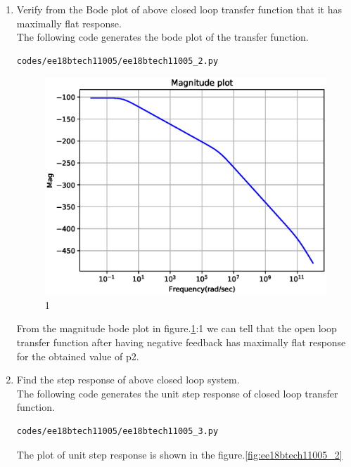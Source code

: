 \begin{enumerate}[label=\thesubsection.\arabic*.,ref=\thesubsection.\theenumi]
\item Verify from the Bode plot of above closed loop transfer function that it has maximally flat response.\\
\solution The following code generates the bode plot of the transfer function.
\begin{lstlisting}
codes/ee18btech11005/ee18btech11005_2.py
\end{lstlisting}
\begin{figure}[!ht]
\centering
\includegraphics[width=\columnwidth]{./figs/ee18btech11005/ee18btech11005_1.eps}
\caption{1}
\label{fig:ee18btech11005_1}
\end{figure}
From the magnitude bode plot in figure.\ref{fig:ee18btech11005_1}:1 we can tell that the open loop transfer function after having negative feedback has maximally flat response for the obtained value of p2. 
\item Find the step response of above closed loop system.\\
\solution The following code generates the unit step response of closed loop transfer function.
\begin{lstlisting}
codes/ee18btech11005/ee18btech11005_3.py
\end{lstlisting}
The plot of unit step response is shown in the figure.\ref{fig:ee18btech11005_2}
\begin{figure}[!ht]
\centering

\end{figure}
\end{enumerate}
